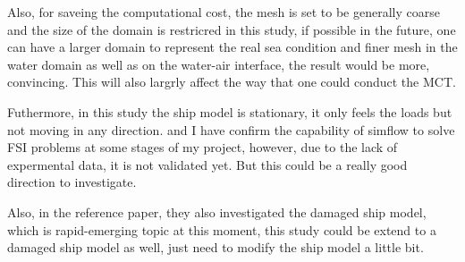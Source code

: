 \documentclass[17pt]{extarticle} %
\begin{document}
Also, for saveing the computational cost, the mesh is set to be generally coarse and the size of the domain
is restricred in this study, if possible in the future, one can have a larger domain to represent the real sea
condition and finer mesh in the water domain as well as on the water-air interface, the result would be more,
convincing. This will also largrly affect the way that one could conduct the MCT.

Futhermore, in this study the ship model is stationary, it only feels the loads but not moving in any direction.
and I have confirm the capability of simflow to solve FSI problems at some stages of my project, however, due to
the lack of expermental data, it is not validated yet. But this could be a really good direction to investigate.

Also, in the reference paper, they also investigated the damaged ship model, which is rapid-emerging topic at this moment,
this study could be extend to a damaged ship model as well, just need to modify the ship model a little bit.
\end{document}
